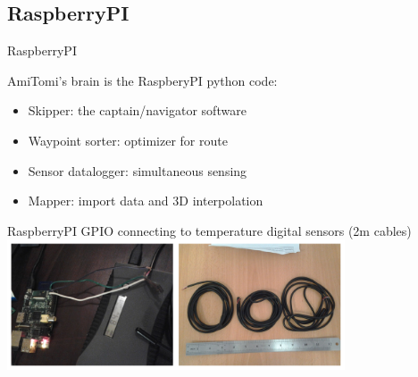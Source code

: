 \documentclass[aspectratio=169,unknownkeysallowed,xcolor=dvipsnames,beamer]{beamer} %
\begin{document}
\subsection{RaspberryPI}
\begin{frame}[fragile]{RaspberryPI}

AmiTomi's brain is the RaspberyPI python code:

\begin{itemize}
 \item Skipper: the captain/navigator software
 \item Waypoint sorter: optimizer for route
 \item Sensor datalogger: simultaneous sensing
 \item Mapper: import data and 3D interpolation 
\end{itemize}
\begin{center}
RaspberryPI GPIO connecting to temperature digital sensors (2m cables)\newline
 \includegraphics[width=10cm]{temperatureprobes}
\end{center}
\end{frame}
\end{document}
